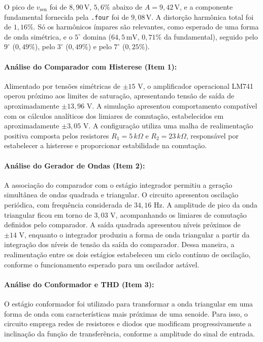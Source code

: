 \documentclass[11pt,a4paper]{article}
\begin{document}
O pico de $v_{\text{sen}}$ foi de $8{,}90\,\text{V}$, $5{,}6\%$ abaixo de $A=9{,}42\,\text{V}$, e a componente fundamental fornecida pela \texttt{.four} foi de $9{,}08\,\text{V}$. A distorção harmônica total foi de $1{,}16\%$. Só os harmônicos ímpares são relevantes, como esperado de uma forma de onda simétrica, e o $5^\circ$ domina ($64{,}5\,\text{mV}$, $0{,}71\%$ da fundamental), seguido pelo $9^\circ$ ($0{,}49\%$), pelo $3^\circ$ ($0{,}49\%$) e pelo $7^\circ$ ($0{,}25\%$).

\paragraph{Análise do Comparador com Histerese (Item 1):}
Alimentado por tensões simétricas de $\pm15\text{ V}$, o amplificador operacional LM741 operou próximo aos limites de saturação, apresentando tensão de saída de aproximadamente $\pm13{,}96\text{ V}$. A simulação apresentou comportamento compatível com os cálculos analíticos dos limiares de comutação, estabelecidos em aproximadamente $\pm3{,}05\text{ V}$. A configuração utiliza uma malha de realimentação positiva composta pelos resistores $R_1=5\,k\Omega$ e $R_2=23\,k\Omega$, responsável por estabelecer a histerese e proporcionar estabilidade na comutação.

\paragraph{Análise do Gerador de Ondas (Item 2):}
A associação do comparador com o estágio integrador permitiu a geração simultânea de ondas quadrada e triangular. O circuito apresentou oscilação periódica, com frequência considerada de $34{,}16\text{ Hz}$. A amplitude de pico da onda triangular ficou em torno de $3{,}03\text{ V}$, acompanhando os limiares de comutação definidos pelo comparador. A saída quadrada apresentou níveis próximos de $\pm14\text{ V}$, enquanto o integrador produziu a forma de onda triangular a partir da integração dos níveis de tensão da saída do comparador. Dessa maneira, a realimentação entre os dois estágios estabeleceu um ciclo contínuo de oscilação, conforme o funcionamento esperado para um oscilador astável.

\paragraph{Análise do Conformador e THD (Item 3):}
O estágio conformador foi utilizado para transformar a onda triangular em uma forma de onda com características mais próximas de uma senoide. Para isso, o circuito emprega redes de resistores e diodos que modificam progressivamente a inclinação da função de transferência, conforme a amplitude do sinal de entrada.
\end{document}
